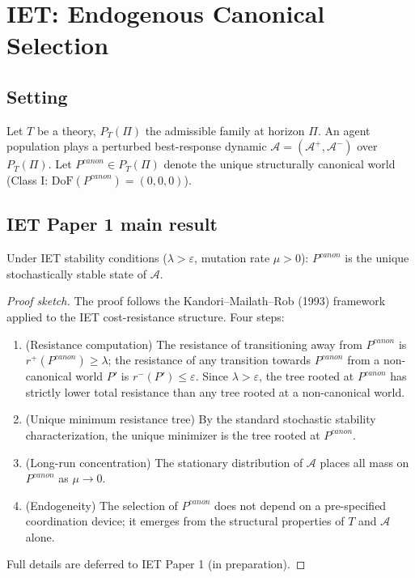 \section{IET: Endogenous Canonical Selection}
\label{app:iet}

\subsection{Setting}

Let $T$ be a theory, $P_T(\Pi)$ the admissible family at horizon $\Pi$.
An agent population plays a perturbed best-response dynamic
$\mathcal{A}=(\mathcal{A}^+, \mathcal{A}^-)$ over $P_T(\Pi)$.
Let $P^{canon}\in P_T(\Pi)$ denote the unique structurally canonical world
(Class I: $\mathrm{DoF}(P^{canon})=(0,0,0)$).

\subsection{IET Paper 1 main result}

\begin{theorem}\label{thm:iet-ecs}
Under IET stability conditions ($\lambda>\varepsilon$, mutation rate $\mu>0$):
$P^{canon}$ is the unique stochastically stable state of $\mathcal{A}$.
\end{theorem}

\begin{proof}[Proof sketch]
The proof follows the Kandori--Mailath--Rob (1993) framework applied to
the IET cost-resistance structure.
Four steps:
\begin{enumerate}
  \item (Resistance computation)
    The resistance of transitioning away from $P^{canon}$ is $r^+(P^{canon})\ge\lambda$;
    the resistance of any transition towards $P^{canon}$ from a non-canonical
    world $P'$ is $r^-(P')\le\varepsilon$. Since $\lambda>\varepsilon$,
    the tree rooted at $P^{canon}$ has strictly lower total resistance
    than any tree rooted at a non-canonical world.
  \item (Unique minimum resistance tree)
    By the standard stochastic stability characterization,
    the unique minimizer is the tree rooted at $P^{canon}$.
  \item (Long-run concentration)
    The stationary distribution of $\mathcal{A}$ places all mass on $P^{canon}$
    as $\mu\to 0$.
  \item (Endogeneity)
    The selection of $P^{canon}$ does not depend on a pre-specified
    coordination device; it emerges from the structural properties of
    $T$ and $\mathcal{A}$ alone.
\end{enumerate}
Full details are deferred to IET Paper 1 (in preparation).
\end{proof}

